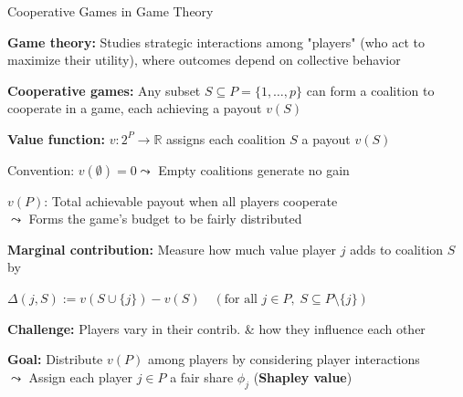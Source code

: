 \documentclass[10pt,compress,t,notes=noshow, xcolor=table]{beamer}
\begin{document}
\begin{framev}[align=top]{Cooperative Games in Game Theory }
\begin{itemizeM}
\item \textbf{Game theory:} Studies strategic interactions among "players" (who act to maximize their utility), where outcomes depend on collective behavior
\item \textbf{Cooperative games:} Any subset $S \subseteq P = \{1, \ldots, p\}$ can form a coalition to cooperate in a game, each achieving a payout $v(S)$
\pause
\item \textbf{Value function:} $v: 2^P \rightarrow \mathbb{R}$ assigns each coalition $S$ a payout $v(S)$
\begin{itemizeS}
\item Convention: $v(\emptyset) = 0 \leadsto$ Empty coalitions generate no gain
\item $v(P)$: Total achievable payout when all players cooperate\\
$\leadsto$ Forms the game's budget to be fairly distributed
\end{itemizeS}%
\item \textbf{Marginal contribution:} Measure how much value player $j$ adds to coalition $S$ by\\
\spacer[0.25]
\centerline{$\Delta(j, S) := v(S \cup \{j\}) - v(S) \quad \left(\text{for all } j \in P,\; S \subseteq P \setminus \{j\}\right)$}
\spacer[0.25]
\pause
\item \textbf{Challenge:} Players vary in their contrib. \& how they influence each other
\item \textbf{Goal:} Distribute $v(P)$ among players by considering player interactions\\
$\leadsto$ Assign each player $j \in P$ a fair share $\phi_j$ (\textbf{Shapley value})
\end{itemizeM}
\end{framev}
\end{document}
